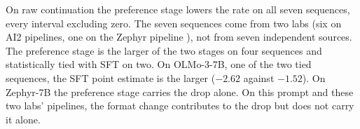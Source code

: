 On raw continuation the preference stage lowers the rate on all seven sequences, every interval excluding zero. The seven sequences come from two labs (six on AI2 pipelines, one on the Zephyr pipeline \citep{tunstall2023zephyr}), not from seven independent sources. The preference stage is the larger of the two stages on four sequences and statistically tied with SFT on two. On OLMo-3-7B, one of the two tied sequences, the SFT point estimate is the larger ($-2.62$ against $-1.52$). On Zephyr-7B the preference stage carries the drop alone. On this prompt and these two labs' pipelines, the format change contributes to the drop but does not carry it alone.
